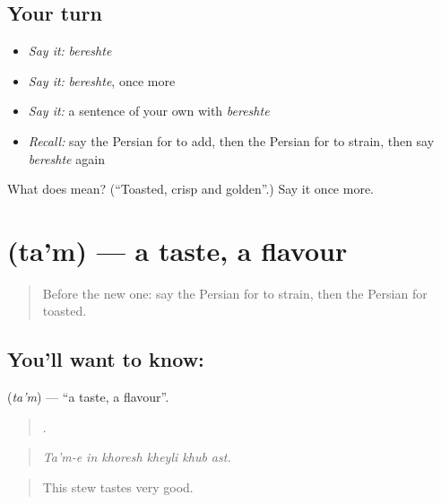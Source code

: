 \subsection*{Your turn}
\begin{itemize}
\raggedright
  \item \emph{Say it:} \emph{bereshte}
  \item \emph{Say it:} \emph{bereshte}, once more
  \item \emph{Say it:} a sentence of your own with \emph{bereshte}
  \item \emph{Recall:} say the Persian for to add, then the Persian for to strain, then say \emph{bereshte} again
\end{itemize}

\begin{tcolorbox}[breakable,colback=teal!4,colframe=teal!35!black,title={Before you move on}]
What does  mean? (\textquotedblleft{}Toasted, crisp and golden\textquotedblright{}.) Say it once more.
\end{tcolorbox}
\section[\texorpdfstring{\fa{طعم} (ta'm)}{طعم (ta'm)}]{ (ta'm) — a taste, a flavour}

\label{lesson:FA-C359-tam}



\begin{quote}
Before the new one: say the Persian for to strain, then the Persian for toasted.
\end{quote}

\subsection*{You'll want to know: }
\textbf{} (\emph{ta'm}) — \textquotedblleft{}a taste, a flavour\textquotedblright{}.

\begin{quote}
     .
\end{quote}

\begin{quote}
\emph{Ta'm-e in khoresh kheyli khub ast.}
\end{quote}

\begin{quote}
This stew tastes very good.
\end{quote}


